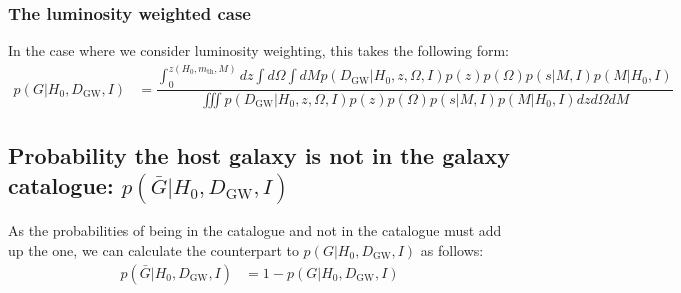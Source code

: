 \documentclass[a4paper,10pt]{article}
\begin{document}
\subsubsection{The luminosity weighted case}
In the case where we consider luminosity weighting, this takes the following form:
\begin{equation}
\begin{aligned}
p(G|H_0,D_{\text{GW}},I) &= \dfrac{\int^{z(H_0,m_{\text{th}},M)}_0 dz \int d\Omega \int dM p(D_{\text{GW}}|H_0,z,\Omega,I) p(z)p(\Omega) p(s|M,I) p(M|H_0,I)}{\iiint p(D_{\text{GW}}|H_0,z,\Omega,I) p(z)p(\Omega) p(s|M,I) p(M|H_0,I) dz d\Omega dM}
\end{aligned}
\end{equation}


\subsection{Probability the host galaxy is not in the galaxy catalogue: $p(\bar{G}|H_0,D_{\text{GW}},I)$}

As the probabilities of being in the catalogue and not in the catalogue must add up the one, we can calculate the counterpart to $p(G|H_0,D_{\text{GW}},I)$ as follows:
\begin{equation}
\begin{aligned}
p(\bar{G}|H_0,D_{\text{GW}},I) &= 1 - p(G|H_0,D_{\text{GW}},I)
\end{aligned}
\end{equation}
\end{document}
